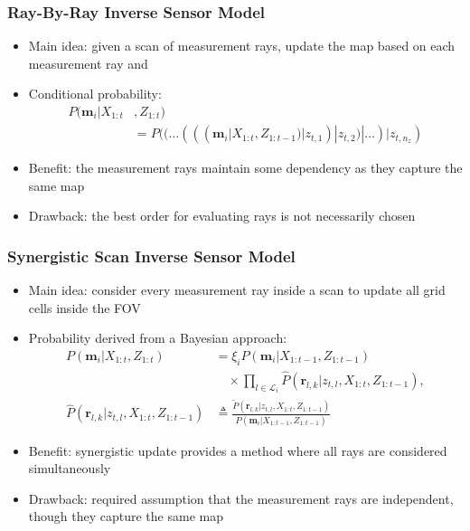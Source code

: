 \documentclass[11pt,professionalfonts,hyperref={pdftex,pdfpagemode=none,pdfstartview=FitH}]{beamer}
\renewcommand{\emph}[1]{\textit{\textbf{\color{blue}{#1}}}}
\begin{document}
\begin{frame}
\frametitle{Ray-By-Ray Inverse Sensor Model}

\begin{itemize}
	\item Main idea: given a scan of measurement rays, update the map based on each measurement ray \emph{individually} and \emph{sequentially}
	\item Conditional probability:
	\begin{align*}
		P(\mathbf{m}_i|X_{1:t}&,Z_{1:t})\nonumber\\&
		=P((\dots(((\mathbf{m}_i|X_{1:t},Z_{1:t-1})|z_{t,1})|z_{t,2})|\ldots)|z_{t,n_z})
	\end{align*}
	\item Benefit: the measurement rays maintain some dependency as they capture the same map
	\item Drawback: the best order for evaluating rays is not necessarily chosen
\end{itemize}

\end{frame}

\begin{frame}
\frametitle{Synergistic Scan Inverse Sensor Model}

\begin{itemize}
	\item Main idea: consider every measurement ray inside a scan \emph{simultaneously} to update all grid cells inside the FOV
	\item Probability derived from a Bayesian approach:
	\begin{align*}
		P(\mathbf{m}_i|X_{1:t},Z_{1:t})
		&=\xi_i P(\mathbf{m}_i|{X_{1:t-1}},Z_{1:t-1})\nonumber\\&\quad\times
		\prod_{l\in\mathcal L_i}
		\hat P(\mathbf{r}_{l,k}|z_{t,l},X_{1:t},Z_{1:t-1}),
		\\
		\hat P(\mathbf{r}_{l,k}|z_{t,l},X_{1:t},Z_{1:t-1})&
		\triangleq \frac{\tilde P(\mathbf{r}_{l,k}|z_{t,l},X_{1:t},Z_{1:t-1})}{P(\mathbf{m}_i|X_{1:t-1},Z_{1:t-1})}
	\end{align*}
	\item Benefit: synergistic update provides a method where all rays are considered simultaneously
	\item Drawback: required assumption that the measurement rays are independent, though they capture the same map
\end{itemize}

\end{frame}
\end{document}
